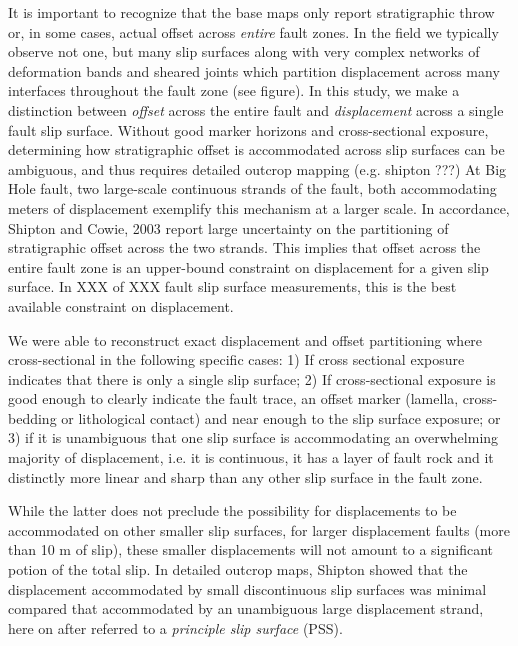 \documentclass[12pt,a4paper]{article}
\begin{document}
It is important to recognize that the base maps only report stratigraphic throw or, in some cases, actual offset across \textit{entire} fault zones. In the field we typically observe not one, but many slip surfaces along with very complex networks of deformation bands and sheared joints which partition displacement across many interfaces throughout the fault zone (see figure). In this study, we make a distinction between \textit{offset} across the entire fault and \textit{displacement} across a single fault slip surface. Without good marker horizons and cross-sectional exposure, determining how stratigraphic offset is accommodated across slip surfaces can be ambiguous, and thus requires detailed outcrop mapping (e.g. shipton ???) At Big Hole fault, two large-scale continuous strands of the fault, both accommodating meters of displacement exemplify this mechanism at a larger scale. In accordance, Shipton and Cowie, 2003 report large uncertainty on the partitioning of stratigraphic offset across the two strands. This implies that offset across the entire fault zone is an upper-bound constraint on displacement for a given slip surface. In XXX of XXX fault slip surface measurements, this is the best available constraint on displacement. 

We were able to reconstruct exact displacement and offset partitioning where cross-sectional in the following specific cases: 1) If cross sectional exposure indicates that there is only a single slip surface; 2) If cross-sectional exposure is good enough to clearly indicate the fault trace, an offset marker (lamella, cross-bedding or lithological contact) and near enough to the slip surface exposure; or 3) if it is unambiguous that one slip surface is accommodating an overwhelming majority of displacement, i.e. it is continuous, it has a layer of fault rock and it distinctly more linear and sharp than any other slip surface in the fault zone. 

While the latter does not preclude the possibility for displacements to be accommodated on other smaller slip surfaces, for larger displacement faults (more than 10 m of slip), these smaller displacements will not amount to a significant potion of the total slip. In detailed outcrop maps, Shipton showed that the displacement accommodated by small discontinuous slip surfaces was minimal compared that accommodated by an unambiguous large displacement strand, here on after referred to a \textit{principle slip surface} (PSS). 
\end{document}
